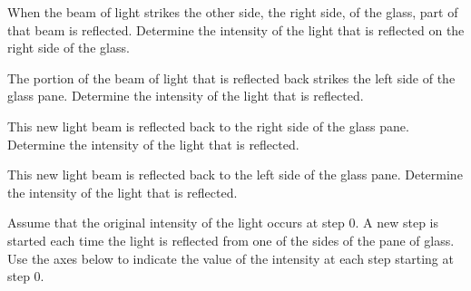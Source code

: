 \begin{problem}
\begin{subproblem}
      \clearpage

    \item When the beam of light strikes the other side, the right side, of the glass, part of that beam is reflected.
    Determine the intensity of the light that is reflected on the right side of the glass.
      \vfill

    \item The portion of the beam of light that is reflected back strikes the left side of the glass pane.
    Determine the intensity of the light that is reflected.

      \vfill

    \item This new light beam is reflected back to the right side of the glass pane.
    Determine the intensity of the light that is reflected.

      \vfill


    \item This new light beam is reflected back to the left side of the glass pane.
    Determine the intensity of the light that is reflected.

        \vfill

        \clearpage

    \item Assume that the original intensity of the light occurs at step 0.
    A new step is started each time the light is reflected from one of the sides of the pane of glass.
    Use the axes below to indicate the value of the intensity at each step starting at step 0.

\end{subproblem}
\end{problem}

